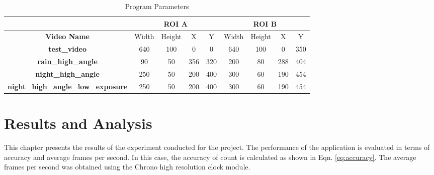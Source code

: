 \documentclass[12pt,a4paper,fleqn]{report}
\begin{document}
\begin{table}[htbp]
    \centering
    \begin{adjustbox}{width=1\textwidth}
    \begin{tabular}{c|cccc|cccc|}
    \cline{2-9}
    \textbf{} & \multicolumn{4}{c|}{\textbf{ROI A}} & \multicolumn{4}{c|}{\textbf{ROI B}} \\ \hline
    \multicolumn{1}{|c|}{\textbf{Video Name}} & \multicolumn{1}{c|}{Width} & \multicolumn{1}{c|}{Height} & \multicolumn{1}{c|}{X} & Y & \multicolumn{1}{c|}{Width} & \multicolumn{1}{c|}{Height} & \multicolumn{1}{c|}{X} & Y \\ \hline
    \multicolumn{1}{|c|}{\textbf{test\_video}} & \multicolumn{1}{c|}{640} & \multicolumn{1}{c|}{100} & \multicolumn{1}{c|}{0} & 0 & \multicolumn{1}{c|}{640} & \multicolumn{1}{c|}{100} & \multicolumn{1}{c|}{0} & 350 \\ \hline
    \multicolumn{1}{|c|}{\textbf{rain\_high\_angle}} & \multicolumn{1}{c|}{90} & \multicolumn{1}{c|}{50} & \multicolumn{1}{c|}{356} & 320 & \multicolumn{1}{c|}{200} & \multicolumn{1}{c|}{80} & \multicolumn{1}{c|}{288} & 404 \\ \hline
    \multicolumn{1}{|c|}{\textbf{night\_high\_angle}} & \multicolumn{1}{c|}{250} & \multicolumn{1}{c|}{50} & \multicolumn{1}{c|}{200} & 400 & \multicolumn{1}{c|}{300} & \multicolumn{1}{c|}{60} & \multicolumn{1}{c|}{190} & 454 \\ \hline
    \multicolumn{1}{|c|}{\textbf{night\_high\_angle\_low\_exposure}} & \multicolumn{1}{c|}{250} & \multicolumn{1}{c|}{50} & \multicolumn{1}{c|}{200} & 400 & \multicolumn{1}{c|}{300} & \multicolumn{1}{c|}{60} & \multicolumn{1}{c|}{190} & 454 \\ \hline
    \end{tabular}
    \end{adjustbox}
    \caption{Program Parameters}
    \label{tab:exprunparam}
\end{table}

\chapter{Results and Analysis}
This chapter presents the results of the experiment conducted for the project.
The performance of the application is evaluated in terms of accuracy and average frames per second.
In this case, the accuracy of count is calculated as shown in Eqn. \ref{eq:accuracy}.
The average frames per second was obtained using the Chrono high resolution clock module.
\end{document}
